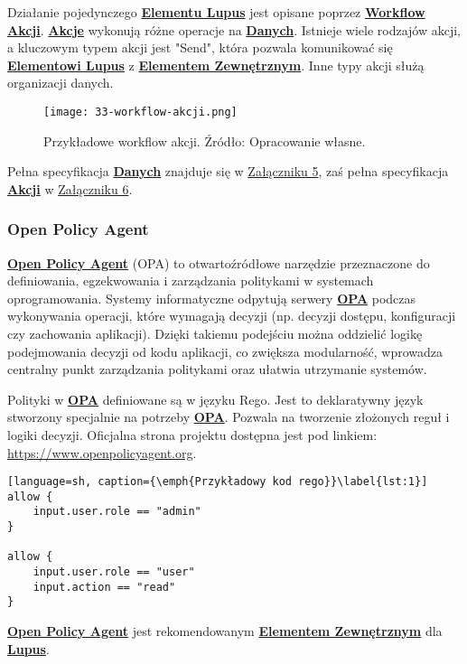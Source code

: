 Działanie pojedynczego \hyperlink{def:element-lupus}{\textbf{Elementu Lupus}} jest opisane poprzez \hyperlink{def:workflow-petli}{\textbf{Workflow Akcji}}. \hyperlink{def:akcja}{\textbf{Akcje}} wykonują różne operacje na \hyperlink{def:dane}{\textbf{Danych}}. Istnieje wiele rodzajów akcji, a kluczowym typem akcji jest "Send", która pozwala komunikować się \hyperlink{def:element-lupus}{\textbf{Elementowi Lupus}} z \hyperlink{def:element-zewnetrzny}{\textbf{Elementem Zewnętrznym}}. Inne typy akcji służą organizacji danych.

\begin{figure}[!h]
    \centering \texttt{[image: 33-workflow-akcji.png]}
    \caption{Przykładowe workflow akcji. Źródło: Opracowanie własne.}\label{fig:33-workflow-akcji}
\end{figure}

Pełna specyfikacja \hyperlink{def:dane}{\textbf{Danych}} znajduje się w \hyperref[appendix:5]{Załączniku 5}, zaś pełna specyfikacja \hyperlink{def:akcja}{\textbf{Akcji}} w \hyperref[appendix:6]{Załączniku 6}.

\subsubsection{Open Policy Agent}

\hyperlink{def:opa}{\textbf{Open Policy Agent}} (OPA) to otwartoźródłowe narzędzie przeznaczone do definiowania, egzekwowania i zarządzania politykami w systemach oprogramowania. Systemy informatyczne odpytują serwery \hyperlink{def:opa}{\textbf{OPA}} podczas wykonywania operacji, które wymagają decyzji (np. decyzji dostępu, konfiguracji czy zachowania aplikacji). Dzięki takiemu podejściu można oddzielić logikę podejmowania decyzji od kodu aplikacji, co zwiększa modularność, wprowadza centralny punkt zarządzania politykami oraz ułatwia utrzymanie systemów.

Polityki w \hyperlink{def:opa}{\textbf{OPA}} definiowane są w języku Rego. Jest to deklaratywny język stworzony specjalnie na potrzeby \hyperlink{def:opa}{\textbf{OPA}}. Pozwala na tworzenie złożonych reguł i logiki decyzji. Oficjalna strona projektu dostępna jest pod linkiem: \url{https://www.openpolicyagent.org}.

\begin{lstlisting}[language=sh, caption={\emph{Przykładowy kod rego}}\label{lst:1}]
allow {
    input.user.role == "admin"
}

allow {
    input.user.role == "user"
    input.action == "read"
}
\end{lstlisting}

\hyperlink{def:opa}{\textbf{Open Policy Agent}} jest rekomendowanym \hyperlink{def:element-zewnetrzny}{\textbf{Elementem Zewnętrznym}} dla \hyperlink{def:lupus}{\textbf{Lupus}}.
